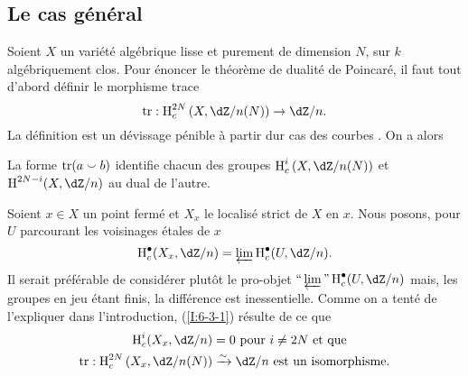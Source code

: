 









\subsection{Le cas général}\label{I:6-3}

Soient $X$ un variété algébrique lisse et purement de dimension $N$, sur 
$k$ algébriquement clos. Pour énoncer le théorème de dualité de 
Poincaré, il faut tout d'abord définir le morphisme trace 
\[
  \tr : \h_c^{2N}\left(X,\dZ/n(N)\right) \to \dZ/n\text{.}
\]
La définition est un dévissage pénible à partir dur cas des courbes 
\cite[XVIII \S 2]{sga4}. On a alors 





\begin{theorem}\label{I:6-3-1}
La forme $\operatorname{tr}(a\smallsmile b)$ identifie chacun des groupes 
$\h_c^i\left(X,\dZ/n(N)\right)$ et $\h^{2 N-i}(X,\dZ/n)$ au dual de l'autre.
\end{theorem}

Soient $x\in X$ un point fermé et $X_x$ le localisé strict de $X$ en $x$. 
Nous posons, pour $U$ parcourant les voisinages étales de $x$ 
\begin{equation}\label{I:eq:6-3-1-1}
  \h_c^\bullet(X_x,\dZ/n) = \varprojlim \h_c^\bullet(U,\dZ/n) \text{.}
\end{equation}
Il serait préférable de considérer plutôt le pro-objet 
$\text{``}\varprojlim\text{''} \h_c^\bullet(U,\dZ/n)$ mais, les groupes en jeu 
étant finis, la différence est inessentielle. Comme on a tenté de 
l'expliquer dans l'introduction, (\ref{I:6-3-1}) résulte de ce que 
\begin{equation}\label{I:eq:6-3-1-2}
\begin{aligned}
  \h_c^i(X_x,\dZ/n) &= 0 \text{ pour $i\ne 2N$ et que } \\
  \tr : \h_c^{2 N}\left(X_x,  \dZ/n(N)\right) &\iso \dZ/n \text{ est un isomorphisme.} 
\end{aligned}
\end{equation}

